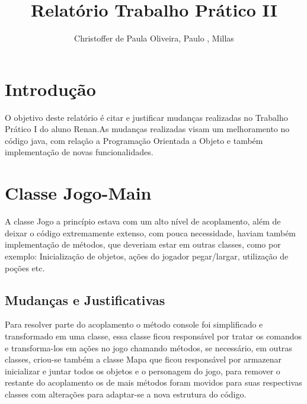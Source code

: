 \documentclass[runningheads,a4paper]{llncs}
\begin{document}
\mainmatter 

\title{Relatório Trabalho Prático II}


\author{Christoffer de Paula Oliveira, Paulo , Millas}



\tocauthor{{}}

\maketitle

\medskip

\begingroup
\let\clearpage\relax
\tableofcontents
{}
\endgroup

\medskip
\medskip

\section*{Introdução}

O objetivo deste relatório é citar e justificar mudanças realizadas no Trabalho Prático I do aluno Renan.As mudanças realizadas visam um melhoramento no código java, com relação a Programação Orientada a Objeto e também implementação de novas funcionalidades.

\section{Classe Jogo-Main}

A classe Jogo a princípio estava com um alto nível de acoplamento, além de deixar o código extremamente extenso, com pouca necessidade, haviam também implementação de métodos, que deveriam estar em outras classes, como por exemplo: Inicialização de objetos, ações do jogador pegar/largar, utilização de poções etc.

\subsection{Mudanças e Justificativas}

Para resolver parte do acoplamento o método console foi simplificado e transformado em uma classe, essa classe ficou responsável por tratar os comandos e transforma-los em ações no jogo chamando métodos, se necessário, em outras classes, criou-se também a classe Mapa que ficou responsável por armazenar inicializar e juntar todos os objetos e o personagem do jogo, para remover o restante do acoplamento os de mais métodos foram movidos para suas respectivas classes com alterações para adaptar-se a nova estrutura do código.
\end{document}
